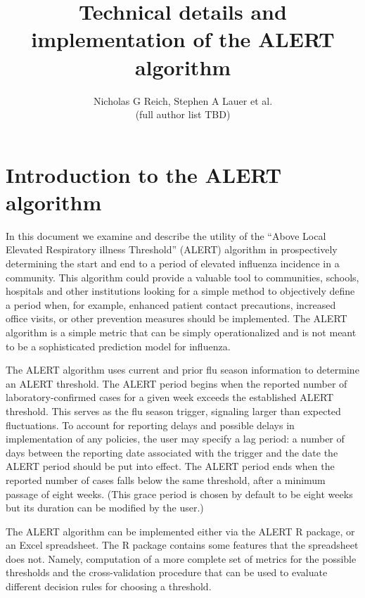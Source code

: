 \documentclass[11pt]{article}\usepackage[]{graphicx}\usepackage[]{color}
\title{Technical details and implementation of the ALERT algorithm}
\author{Nicholas G Reich, Stephen A Lauer et al. \\  (full author list TBD)}
\begin{document}
\maketitle


\section{Introduction to the ALERT algorithm}
In this document we examine and describe the utility of the ``Above Local Elevated Respiratory illness Threshold'' (ALERT) algorithm in prospectively determining the start and end to a period of elevated influenza incidence in a community. This algorithm could provide a valuable tool to communities, schools, hospitals and other institutions looking for a simple method to objectively define a period when, for example, enhanced patient contact precautions, increased office visits, or other prevention measures should be implemented. The ALERT algorithm is a simple metric that can be simply operationalized and is not meant to be a sophisticated prediction model for influenza. 

The ALERT algorithm uses current and prior flu season information to determine an ALERT threshold. The ALERT period begins when the reported number of laboratory-confirmed cases for a given week exceeds the established ALERT threshold. This serves as the flu season trigger, signaling larger than expected fluctuations. To account for reporting delays and possible delays in implementation of any policies, the user may specify a lag period: a number of days between the reporting date associated with the trigger and the date the ALERT period should be put into effect. The ALERT period ends when the reported number of cases falls below the same threshold, after a minimum passage of eight weeks. (This grace period is chosen by default to be eight weeks but its duration can be modified by the user.) 

The ALERT algorithm can be implemented either via the ALERT R package, or an Excel spreadsheet. The R package contains some features that the spreadsheet does not. Namely, computation of a more complete set of metrics for the possible thresholds and the cross-validation procedure that can be used to evaluate different decision rules for choosing a threshold. 
\end{document}
